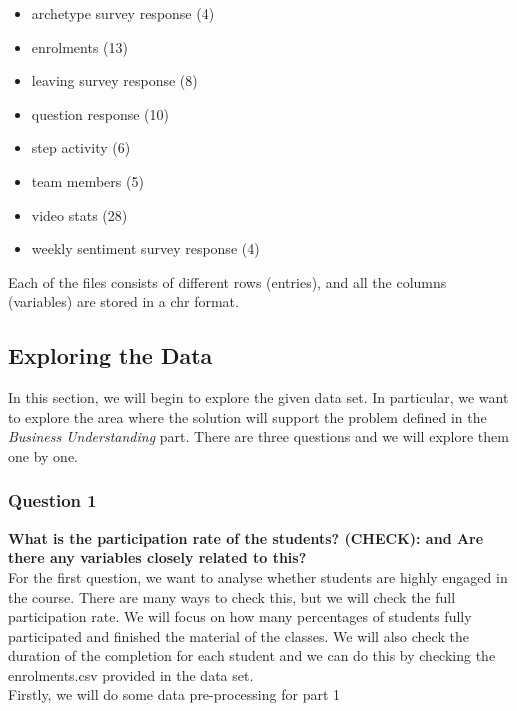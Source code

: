 \documentclass[12pt,]{article}
\providecommand{\tightlist}{%
\setlength{\itemsep}{0pt}\setlength{\parskip}{0pt}}
\begin{document}
\begin{itemize}
\tightlist
\item
  archetype survey response (4)
\item
  enrolments (13)
\item
  leaving survey response (8)
\item
  question response (10)
\item
  step activity (6)
\item
  team members (5)
\item
  video stats (28)
\item
  weekly sentiment survey response (4)
\end{itemize}

\noindent Each of the files consists of different rows (entries), and
all the columns (variables) are stored in a chr format.

\hypertarget{exploring-the-data}{%
\subsection{Exploring the Data}\label{exploring-the-data}}

In this section, we will begin to explore the given data set. In
particular, we want to explore the area where the solution will support
the problem defined in the \emph{Business Understanding} part. There are
three questions and we will explore them one by one.

\hypertarget{question-1}{%
\subsubsection{Question 1}\label{question-1}}

\textbf{What is the participation rate of the students? (CHECK): and Are
there any variables closely related to this?}\\
\hfill\break For the first question, we want to analyse whether students
are highly engaged in the course. There are many ways to check this, but
we will check the full participation rate. We will focus on how many
percentages of students fully participated and finished the material of
the classes. We will also check the duration of the completion for each
student and we can do this by checking the enrolments.csv provided in
the data set.\\
\hfill\break Firstly, we will do some data pre-processing for part 1
\end{document}
